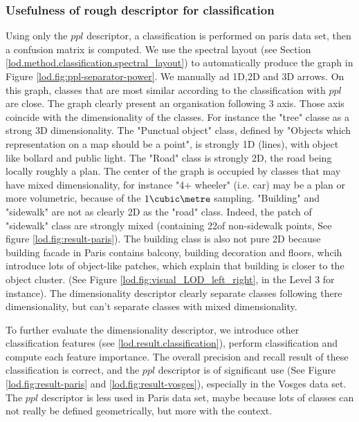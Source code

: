   
		\subsubsection{Usefulness of rough descriptor for classification}
		
		Using only the $ppl$ descriptor, a classification is performed on paris data set, then a confusion matrix is computed.
		We use the spectral layout (see Section \ref{lod.method.classification.spectral_layout}) to automatically produce the graph in Figure \ref{lod.fig:ppl-separator-power}. 
		We manually ad 1D,2D and 3D arrows.
		On this graph, classes that are most similar according to the classification with $ppl$ are close. The graph clearly present an organisation following 3 axis. Those axis coincide with the dimensionality of the classes. For instance the "tree" classe as a strong 3D dimensionality. The "Punctual object" class, defined by "Objects which representation on a map should be a point", is strongly 1D (lines), with object like bollard and public light. The "Road" class is strongly 2D, the road being locally roughly a plan. The center of the graph is occupied by classes that may have mixed dimensionality, for instance "4+ wheeler" (i.e. car) may be a plan or more volumetric, because of the $1 \cubic \metre$ sampling.
		"Building" and "sidewalk" are not as clearly 2D as  the "road" class. Indeed, the patch of "sidewalk" class are strongly mixed (containing 22\mypercent of non-sidewalk points, See figure \ref{lod.fig:result-paris}). The building class is also not pure 2D because building facade in Paris contains balcony, building decoration and floors, whcih introduce lots of object-like patches, which explain that building is closer to the object cluster. (See Figure \ref{lod.fig:visual_LOD_left_right}, in the Level 3 for instance).
		The dimensionality descriptor clearly separate classes following there dimensionality, but can't separate classes with mixed dimensionality.
		
		
		To further evaluate the dimensionality descriptor, we introduce other classification features (see \ref{lod.result.classification}), perform classification and compute each feature importance.
		The overall precision and recall result of these classification is correct, and the $ppl$ descriptor is of significant use (See Figure \ref{lod.fig:result-paris} and \ref{lod.fig:result-vosges}), especially in the Vosges data set. The $ppl$ descriptor is less used in Paris data set, maybe because lots of classes can not really be defined geometrically, but more with the context.
		  
